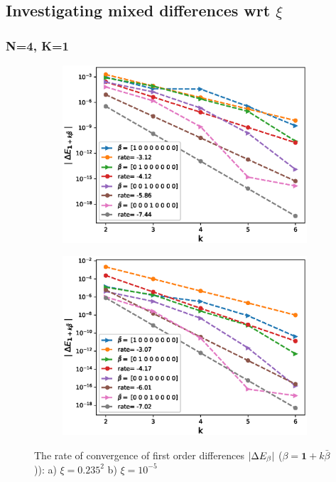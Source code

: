 \documentclass[11pt]{article}
\begin{document}
\newpage
\subsection{Investigating mixed differences wrt $\xi$ }\label{sec:mixed differences rbergomi_wrt_xi}

\subsubsection*{N=4, K=1 }
\begin{figure}[h!]
\centering
\begin{subfigure}{.5\textwidth}
\centering
\includegraphics[width=1\linewidth]{./figures/effect_rho_differences/H_0_43_K_1/N_4/first_difference_rbergomi_4steps_H_043_K_1_rho__0_9_with_rate_W1.eps}
\caption{}
\label{fig:sub3}
\end{subfigure}%
\begin{subfigure}{.5\textwidth}
\centering
\includegraphics[width=1\linewidth]{./figures/effect_xi_differences/H_0_43_K_1/N_4/first_difference_rbergomi_4steps_H_043_K_1_xi_10__5_with_rate_W1.eps}
\caption{}
\label{fig:sub4}
\end{subfigure}

\caption{The rate of convergence of  first order differences $\left\lvert\Delta E_{\beta}\right\rvert$ ($\beta=\mathbf{1}+k \bar{\beta}$)): a) $\xi=0.235^2$ b)  $\xi=10^{-5}$}
\label{fig:test2}
\end{figure}
\end{document}
